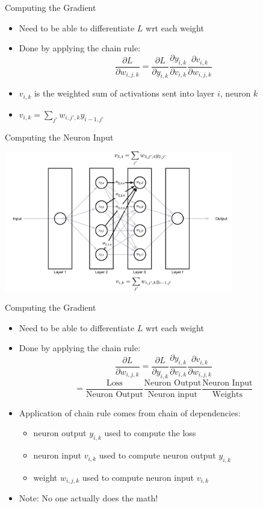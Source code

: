 \documentclass[aspectratio=169]{beamer}
\begin{document}
\begin{frame}{Computing the Gradient}

\begin{itemize}
	\item Need to be able to differentiate $L$ wrt each weight
	\item Done by applying the chain rule:
	$$ \frac{\partial L}{\partial w_{i,j,k}} = \frac{\partial L}{\partial y_{i,k}} 
						\frac{\partial y_{i,k}}{\partial v_{i,k}}
						\frac{\partial v_{i,k}}{\partial w_{i,j,k}}$$
	\item $v_{i,k}$ is the weighted sum of activations sent into layer $i$, neuron $k$
	\item $v_{i,k} = \sum_{j'} w_{i,j',k} y_{i-1,j'}$
\end{itemize}
\end{frame}
\begin{frame}{Computing the Neuron Input}

\includegraphics[width=0.75\textwidth]{lectBP/nnbpComputeG.pdf}
\end{frame}
\begin{frame}{Computing the Gradient}

\begin{itemize}
	\item Need to be able to differentiate $L$ wrt each weight
	\item Done by applying the chain rule:
	$$ \frac{\partial L}{\partial w_{i,j,k}} = \frac{\partial L}{\partial y_{i,k}} 
						\frac{\partial y_{i,k}}{\partial v_{i,k}}
						\frac{\partial v_{i,k}}{\partial w_{i,j,k}}$$
	$$ = \frac{\text{Loss}}{\text{Neuron Output}}\frac{\text{Neuron Output}}{\text{Neuron input}}\frac{\text{Neuron Input}}{\text{Weights}}$$
	\item Application of chain rule comes from chain of dependencies: 
	\begin{itemize}
		\item neuron output $y_{i,k}$ used to compute the loss
		\item neuron input $v_{i,k}$ used to compute neuron output $y_{i,k}$
		\item weight $w_{i,j,k}$ used to compute neuron input $v_{i,k}$
	\end{itemize}
	\item Note: No one actually does the math!
\end{itemize}
\end{frame}
\end{document}
